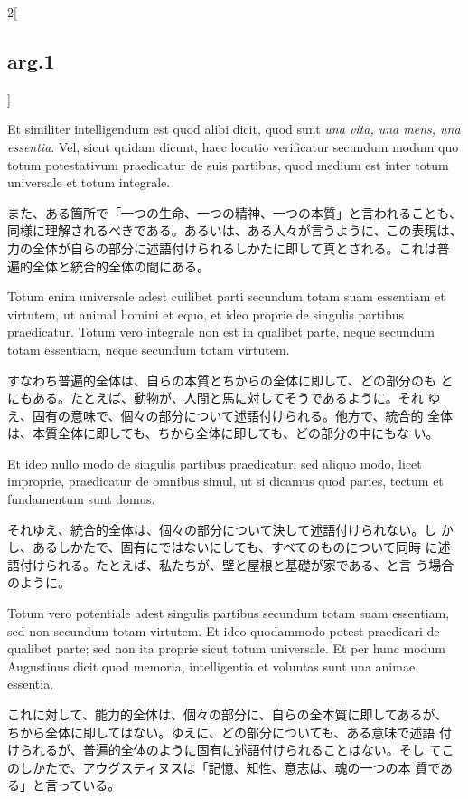\documentclass[paper=a4paper,fontsize=10pt,jafontsize=9pt,titlepage]{jlreq}
\begin{document}
\begin{paracol}{2}[\subsection{arg.1}]
\switchcolumn*

 Et similiter intelligendum est quod alibi dicit, quod sunt {\itshape
una vita, una mens, una essentia}. Vel, sicut quidam dicunt, haec
locutio verificatur secundum modum quo totum potestativum praedicatur
de suis partibus, quod medium est inter totum universale et totum
integrale.

\switchcolumn

また、ある箇所で「一つの生命、一つの精神、一つの本質」と言われることも、
同様に理解されるべきである。あるいは、ある人々が言うように、この表現は、
力の全体が自らの部分に述語付けられるしかたに即して真とされる。これは普
遍的全体と統合的全体の間にある。

\switchcolumn*

 Totum enim universale adest cuilibet parti secundum totam suam
essentiam et virtutem, ut animal homini et equo, et ideo proprie de
singulis partibus praedicatur. Totum vero integrale non est in
qualibet parte, neque secundum totam essentiam, neque secundum totam
virtutem.

\switchcolumn

 すなわち普遍的全体は、自らの本質とちからの全体に即して、どの部分のも
 とにもある。たとえば、動物が、人間と馬に対してそうであるように。それ
 ゆえ、固有の意味で、個々の部分について述語付けられる。他方で、統合的
 全体は、本質全体に即しても、ちから全体に即しても、どの部分の中にもな
 い。
\switchcolumn*

 Et ideo nullo modo de singulis partibus praedicatur; sed aliquo modo,
licet improprie, praedicatur de omnibus simul, ut si dicamus quod
paries, tectum et fundamentum sunt domus. 

\switchcolumn

 それゆえ、統合的全体は、個々の部分について決して述語付けられない。し
 かし、あるしかたで、固有にではないにしても、すべてのものについて同時
 に述語付けられる。たとえば、私たちが、壁と屋根と基礎が家である、と言
 う場合のように。

 \switchcolumn*

Totum vero potentiale adest singulis partibus secundum totam suam
essentiam, sed non secundum totam virtutem.  Et ideo quodammodo potest
praedicari de qualibet parte; sed non ita proprie sicut totum
universale. Et per hunc modum Augustinus dicit quod memoria,
intelligentia et voluntas sunt una animae essentia.

\switchcolumn

 これに対して、能力的全体は、個々の部分に、自らの全本質に即してあるが、
 ちから全体に即してはない。ゆえに、どの部分についても、ある意味で述語
 付けられるが、普遍的全体のように固有に述語付けられることはない。そし
 てこのしかたで、アウグスティヌスは「記憶、知性、意志は、魂の一つの本
 質である」と言っている。


\end{paracol}
\end{document}
